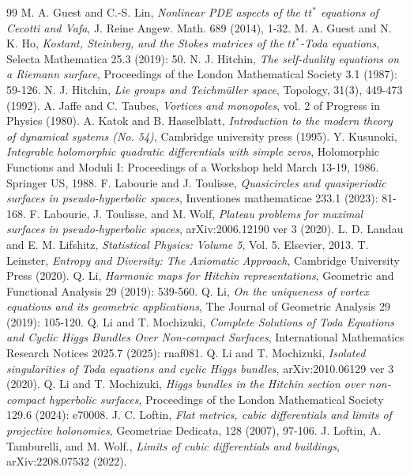 \documentclass[12pt]{article}
\theoremstyle{definition}
\begin{document}
\begin{thebibliography}{99}
 M. A. Guest and C.-S. Lin, {\it Nonlinear PDE aspects of the $tt^\ast$ equations of Cecotti and Vafa}, J. Reine Angew. Math. 689 (2014), 1-32.
 M. A. Guest and N. K. Ho, {\it Kostant, Steinberg, and the Stokes matrices of the $tt^\ast$-Toda equations}, Selecta Mathematica 25.3 (2019): 50.
 N. J. Hitchin, {\it The self-duality equations on a Riemann surface}, Proceedings of the London Mathematical Society 3.1 (1987): 59-126.
 N. J. Hitchin, {\it Lie groups and Teichm\"uller space}, Topology, 31(3), 449-473 (1992).
 A. Jaffe and C. Taubes, {\it Vortices and monopoles}, vol. 2 of Progress in Physics (1980).
 A. Katok and B. Hasselblatt, {\it Introduction to the modern theory of dynamical systems (No. 54)}, Cambridge university press (1995). 
 Y. Kusunoki, {\it Integrable holomorphic quadratic differentials with simple zeros}, Holomorphic Functions and Moduli I: Proceedings of a Workshop held March 13-19, 1986. Springer US, 1988.
 F. Labourie and J. Toulisse, {\it Quasicircles and quasiperiodic surfaces in pseudo-hyperbolic spaces}, Inventiones mathematicae 233.1 (2023): 81-168.
 F. Labourie, J. Toulisse, and M. Wolf, {\it Plateau problems for maximal surfaces in pseudo-hyperbolic spaces}, arXiv:2006.12190 ver 3 (2020).
 L. D. Landau and E. M. Lifshitz, {\it Statistical Physics: Volume 5}, Vol. 5. Elsevier, 2013.
 T. Leinster, {\it Entropy and Diversity: The Axiomatic Approach}, Cambridge University Press (2020).
 Q. Li, {\it Harmonic maps for Hitchin representations}, Geometric and Functional Analysis 29 (2019): 539-560.
 Q. Li, {\it On the uniqueness of vortex equations and its geometric applications}, The Journal of Geometric Analysis 29 (2019): 105-120.
 Q. Li and T. Mochizuki, {\it Complete Solutions of Toda Equations and Cyclic Higgs Bundles Over Non-compact Surfaces}, International Mathematics Research Notices 2025.7 (2025): rnaf081.
 Q. Li and T. Mochizuki, {\it Isolated singularities of Toda equations and cyclic Higgs bundles}, arXiv:2010.06129 ver 3 (2020).
 Q. Li and T. Mochizuki, {\it Higgs bundles in the Hitchin section over non‐compact hyperbolic surfaces}, Proceedings of the London Mathematical Society 129.6 (2024): e70008.
 J. C. Loftin, {\it Flat metrics, cubic differentials and limits of projective holonomies}, Geometriae Dedicata, 128 (2007), 97-106.
 J. Loftin, A. Tamburelli, and M. Wolf., {\it Limits of cubic differentials and buildings}, arXiv:2208.07532 (2022).

\end{thebibliography}
\end{document}
